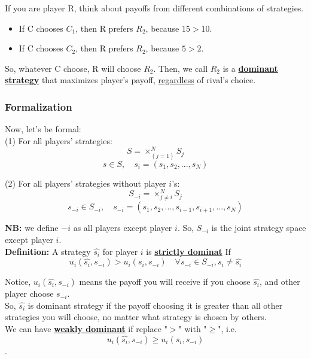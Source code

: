 \documentclass[12pt]{article}
\newcommand{\bb}[1]{{\textbf {#1}}}
\newcommand{\e}[1]{$ #1 $}
\newcommand{\ee}[1]{$$ #1 $$}
\begin{document}
\begin{spacing}{1.5}
                If you are player R, think about payoffs from different combinations of strategies.

                \begin{itemize}
                    \item If C chooses \e{C_1}, then R prefers \e{R_2}, because \e{15 > 10}.
                    \item If C chooses \e{C_2}, then R prefers \e{R_2}, because \e{5 > 2}.
                \end{itemize}
            
                So, whatever C choose, R will choose \e{R_2}. Then, we call \e{R_2} is a \bb{\underline{dominant strategy}}
                that maximizes player's payoff, \underline{regardless} of rival's choice.\\

            \subsubsection{Formalization}

                Now, let's be formal:\\

                (1) For all players' strategies:
                \ee{ S = \times_(j = 1)^N S_j}
                \ee{ s \in S, \quad s_i = (s_1,s_2,...,s_N)}

                (2) For all players' strategies without player \e{i}'s:
                \ee{ S_{-i} = \times_{j \neq i} ^N S_j}
                \ee{ s_{-i} \in S_{-i}, \quad s_{-i} = (s_1,s_2,...,s_{i-1},s_{i+1},...,s_N)}

                \bb{NB:} we define \e{-i} as all players except player \e{i}. So, \e{S_{-i}} is the joint
                strategy space except player \e{i}.\\

                \bb{Definition:}
                A strategy \e{\hat{s_i}} for player \e{i} is \bb{\underline{strictly dominat}} If
                \ee{u_i(\hat{s_i}, s_{-i}) > u_i(s_i, s_{-i}) \quad \forall s_{-i} \in S_{-i}, s_i \neq \hat{s_i}}
                
                Notice, \e{u_i(\hat{s_i},s_{-i})} means the payoff you will receive if you choose \e{\hat{s_i}}, and
                other player choose \e{s_{-i}}.\\
                So, \e{\hat{s_i}} is dominant strategy if the payoff choosing it is greater than all other strategies
                you will choose, no matter what strategy is chosen by others.\\
                We can have \bb{\underline{weakly dominant}} if replace "\e{>}" with "\e{\ge}", i.e.
                \ee{u_i(\hat{s_i}, s_{-i}) \ge u_i(s_i, s_{-i})}.
            

\end{spacing}
\end{document}
